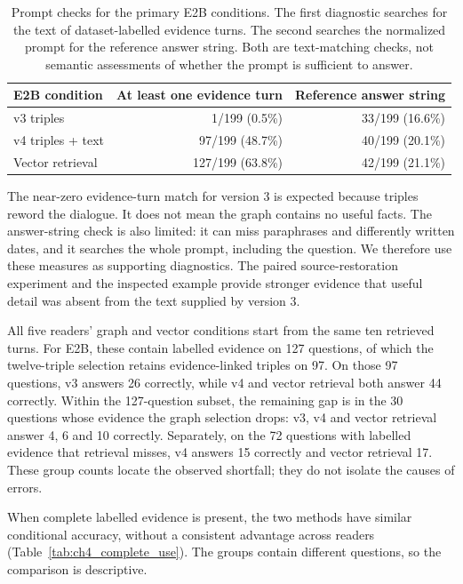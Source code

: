 \begin{table}[htbp]
  \centering
  \small
  \begin{tabular}{lrr}
    \toprule
    E2B condition & At least one evidence turn & Reference answer string \\
    \midrule
    v3 triples           & 1/199 (0.5\%)   & 33/199 (16.6\%) \\
    v4 triples + text    & 97/199 (48.7\%) & 40/199 (20.1\%) \\
    Vector retrieval     & 127/199 (63.8\%) & 42/199 (21.1\%) \\
    \bottomrule
  \end{tabular}
  \caption{Prompt checks for the primary E2B conditions. The first diagnostic searches for
  the text of dataset-labelled evidence turns. The second searches the normalized prompt for
  the reference answer string. Both are text-matching checks, not semantic assessments of
  whether the prompt is sufficient to answer.}
  \label{tab:ch6_evidence}
\end{table}

The near-zero evidence-turn match for version 3 is expected because triples reword the
dialogue. It does not mean the graph contains no useful facts. The answer-string check is
also limited: it can miss paraphrases and differently written dates, and it searches the
whole prompt, including the question. We therefore use these measures as supporting
diagnostics. The paired source-restoration experiment and the inspected example provide
stronger evidence that useful detail was absent from the text supplied by version 3.

All five readers' graph and vector conditions start from the same ten retrieved turns.
For E2B, these contain labelled evidence on 127 questions, of which the twelve-triple
selection retains evidence-linked triples on 97. On those 97 questions, v3 answers 26
correctly, while v4 and vector retrieval both answer 44 correctly. Within the 127-question
subset, the remaining gap is in the 30 questions whose evidence the graph selection drops:
v3, v4 and vector retrieval answer 4, 6 and 10 correctly. Separately, on the 72 questions
with labelled evidence that retrieval misses, v4 answers 15 correctly and vector retrieval
17. These group counts locate the observed shortfall; they do not isolate the causes of
errors.

When complete labelled evidence is present, the two methods have similar conditional
accuracy, without a consistent advantage across readers (Table~\ref{tab:ch4_complete_use}).
The groups contain different questions, so the comparison is descriptive.

